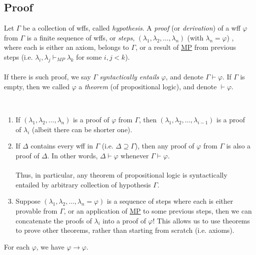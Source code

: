 \documentclass{treatise}
\begin{document}
\subsection{Proof}
Let $\Gamma$ be a collection of wffs, called \emph{hypothesis}. A \emph{proof} (or \emph{derivation}) of a wff $\varphi$ from $\Gamma$ is a finite sequence of wffs, or \emph{steps}, $(\lambda_1, \lambda_2, \hdots, \lambda_n)$ (with $\lambda_n = \varphi$) , where each is either an axiom, belongs to $\Gamma$, or a result of \hyperref[HPL-R-MP]{MP} from previous steps (i.e. $\lambda_i, \lambda_j \vdash_{MP} \lambda_k$ for some $i, j < k$).
\\
\\
If there is such proof, we say $\Gamma$ \emph{syntactically entails} $\varphi$, and denote $\Gamma \vdash \varphi$. If $\Gamma$ is empty, then we called $\varphi$ a \emph{theorem} (of propositional logic), and denote $\vdash \varphi$.
\begin{remark} \label{logic-proof-props} \ 
\begin{enumerate}
    \item If $(\lambda_1, \lambda_2, \hdots, \lambda_n)$ is a proof of $\varphi$ from $\Gamma$, then $(\lambda_1, \lambda_2, \hdots, \lambda_{i - 1})$ is a proof of $\lambda_i$ (albeit there can be shorter one).
    \item If $\Delta$ contains every wff in $\Gamma$ (i.e. $\Delta \supseteq \Gamma$), then any proof of $\varphi$ from $\Gamma$ is also a proof of $\Delta$. In other words, $\Delta \vdash \varphi$ whenever $\Gamma \vdash \varphi$.
	\\
	\\
	Thus, in particular, any theorem of propositional logic is syntactically entailed by arbitrary collection of hypothesis $\Gamma$.
    \item Suppose $(\lambda_1, \lambda_2, \hdots, \lambda_n = \varphi)$ is a sequence of steps where each is either provable from $\Gamma$, or an application of \hyperref[HPL-R-MP]{MP} to some previous steps, then we can concatenate the proofs of $\lambda_i$ into a proof of $\varphi$! This allows us to use theorems to prove other theorems, rather than starting from scratch (i.e. axioms).
\end{enumerate}
\end{remark}
\begin{lemma}[Reflexivity] \label{HPL-T-RX}
For each $\varphi$, we have $\varphi \to \varphi$.
\end{lemma}
\end{document}
